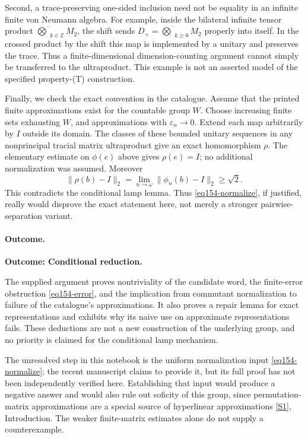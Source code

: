 \documentclass[11pt,a4paper]{article}
\newcommand{\Z}{\mathbb{Z}}
\newcommand{\eps}{\varepsilon}
\newcommand{\sref}[2]{\hyperlink{source:#1:#2}{[S#2]}}
\numberwithin{equation}{section}
\begin{document}
Second, a trace-preserving one-sided inclusion need not be equality in an
infinite finite von Neumann algebra. For example, inside the bilateral
infinite tensor product $\overline\bigotimes_{k\in\Z}M_2$, the shift sends
$D_+=\overline\bigotimes_{k\ge0}M_2$ properly into itself. In the crossed
product by the shift this map is implemented by a unitary and preserves the
trace. Thus a finite-dimensional dimension-counting argument cannot simply
be transferred to the ultraproduct. This example is not an asserted model
of the specified property-(T) construction.

Finally, we check the exact convention in the catalogue. Assume that the
printed finite approximations exist for the countable group $W$. Choose
increasing finite sets exhausting $W$, and approximations with
$\eps_n\to0$. Extend each map arbitrarily by $I$ outside its domain. The
classes of these bounded unitary sequences in any nonprincipal tracial
matrix ultraproduct give an exact homomorphism $\rho$. The elementary
estimate on $\phi(e)$ above gives $\rho(e)=I$; no additional normalization
was assumed. Moreover
\[
 \|\rho(b)-I\|_2=\lim_{n\to\omega}\|\phi_n(b)-I\|_2\ge\sqrt2.
\]
This contradicts the conditional lamp lemma. Thus
\eqref{eq154-normalize}, if justified, really would disprove the exact
statement here, not merely a stronger pairwise-separation variant.

\paragraph{Outcome.}
\textbf{Outcome: Conditional reduction.}

The supplied argument proves nontriviality of the candidate word, the
finite-error obstruction \eqref{eq154-error}, and the implication from
commutant normalization to failure of the catalogue's approximations. It
also proves a repair lemma for exact representations and exhibits why its
naive use on approximate representations fails. These deductions are not a
new construction of the underlying group, and no priority is claimed for
the conditional lamp mechanism.

The unresolved step in this notebook is the uniform normalization input
\eqref{eq154-normalize}; the recent manuscript claims to provide it, but
its full proof has not been independently verified here. Establishing that
input would produce a negative answer and would also rule out soficity of
this group, since permutation-matrix approximations are a special source
of hyperlinear approximations \sref{statement}{1}, Introduction. The weaker
finite-matrix estimates alone do not supply a counterexample.
\end{document}
